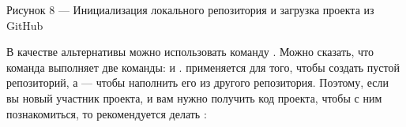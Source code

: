 \documentclass[letterpaper,10pt,russian]{sphinxmanual}
\begin{document}
\sphinxAtStartPar
{}

\sphinxAtStartPar
Рисунок 8 — Инициализация локального  репозитория и загрузка проекта из GitHub

\sphinxAtStartPar
В качестве альтернативы можно использовать команду . Можно сказать, что команда  выполняет две команды:  и .
 применяется для того, чтобы создать пустой репозиторий, а  — чтобы наполнить его из другого репозитория. Поэтому, если вы новый участник проекта, и вам нужно получить код проекта, чтобы с ним познакомиться, то рекомендуется делать :

\sphinxAtStartPar
{}
\end{document}

